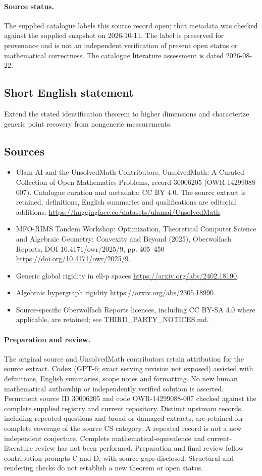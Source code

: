 \documentclass[11pt]{article}
\begin{document}
\paragraph{Source status.}
The supplied catalogue labels this source record open; that metadata was checked against the supplied snapshot on 2026-10-11. The label is preserved for provenance and is not an independent verification of present open status or mathematical correctness. The catalogue literature assessment is dated 2026-08-22.
\subsection{Short English statement}
Extend the stated identification theorem to higher dimensions and characterize generic point recovery from nongeneric measurements.
\subsection{Sources}
\begin{itemize}
\item[S1] Ulam AI and the UnsolvedMath Contributors, UnsolvedMath: A Curated Collection of Open Mathematics Problems, record 30006205 (OWR-14299088-007). Catalogue curation and metadata: CC BY 4.0. The source extract is retained; definitions, English summaries and qualifications are editorial additions.
\url{https://huggingface.co/datasets/ulamai/UnsolvedMath}.
\item[S2] MFO-RIMS Tandem Workshop: Optimization, Theoretical Computer Science and Algebraic Geometry: Convexity and Beyond (2025), Oberwolfach Reports, DOI 10.4171/owr/2025/9, pp. 405--450
\url{https://doi.org/10.4171/owr/2025/9}.
\item[S3] Generic global rigidity in ell-p spaces
\url{https://arxiv.org/abs/2402.18190}.
\item[S4] Algebraic hypergraph rigidity
\url{https://arxiv.org/abs/2305.18990}.
\item Source-specific Oberwolfach Reports licences, including CC BY-SA 4.0 where applicable, are retained; see THIRD\_PARTY\_NOTICES.md.
\end{itemize}
\paragraph{Preparation and review.}
The original source and UnsolvedMath contributors retain attribution for the source extract. Codex (GPT-6; exact serving revision not exposed) assisted with definitions, English summaries, scope notes and formatting. No new human mathematical authorship or independently verified solution is asserted. Permanent source ID 30006205 and code OWR-14299088-007 checked against the complete supplied registry and current repository. Distinct upstream records, including repeated questions and broad or damaged extracts, are retained for complete coverage of the source CS category. A repeated record is not a new independent conjecture. Complete mathematical-equivalence and current-literature review has not been performed. Preparation and final review follow contribution prompts C and D, with source gaps disclosed. Structural and rendering checks do not establish a new theorem or open status.
\label{end:30006205}
\end{document}

